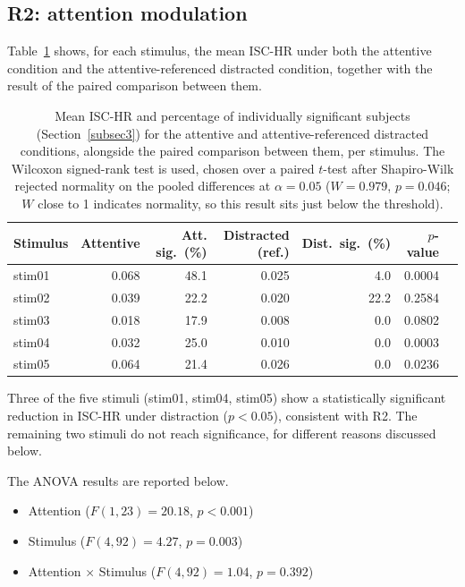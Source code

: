 \documentclass[pdflatex,sn-mathphys-num]{sn-jnl}%
\theoremstyle{thmstyleone}%
\theoremstyle{thmstyletwo}%
\theoremstyle{thmstylethree}%
\begin{document}
\subsection{R2: attention modulation}\label{subsec7}


Table~\ref{tab:r2} shows, for each stimulus, the mean ISC-HR under both the attentive condition and the attentive-referenced distracted condition, together with the result of the paired comparison between them.

\begin{table}[htbp]
\centering
\begin{tabular}{lrrrrrr}
\toprule
Stimulus & Attentive & Att. sig.\ (\%) & Distracted (ref.) & Dist.\ sig.\ (\%) & $p$-value \\
\midrule
stim01 & 0.068 & 48.1 & 0.025 & 4.0  & 0.0004 \\
stim02 & 0.039 & 22.2 & 0.020 & 22.2 & 0.2584 \\
stim03 & 0.018 & 17.9 & 0.008 & 0.0  & 0.0802 \\
stim04 & 0.032 & 25.0 & 0.010 & 0.0  & 0.0003 \\
stim05 & 0.064 & 21.4 & 0.026 & 0.0  & 0.0236 \\
\bottomrule
\end{tabular}
\caption{Mean ISC-HR and percentage of individually significant subjects (Section~\ref{subsec3}) for the attentive and attentive-referenced distracted conditions, alongside the paired comparison between them, per stimulus. The Wilcoxon signed-rank test is used, chosen over a paired $t$-test after Shapiro-Wilk rejected normality on the pooled differences at $\alpha=0.05$ ($W=0.979$, $p=0.046$; $W$ close to 1 indicates normality, so this result sits just below the threshold).}
\label{tab:r2}
\end{table}

Three of the five stimuli (stim01, stim04, stim05) show a statistically significant reduction in ISC-HR under distraction ($p<0.05$), consistent with R2. The remaining two stimuli do not reach significance, for different reasons discussed below.

The ANOVA results are reported below.
\begin{itemize}
\item Attention ($F(1,23)=20.18$, $p<0.001$)
\item Stimulus ($F(4,92)=4.27$, $p=0.003$)
\item Attention $\times$ Stimulus ($F(4,92)=1.04$, $p=0.392$)
\end{itemize}
\end{document}
